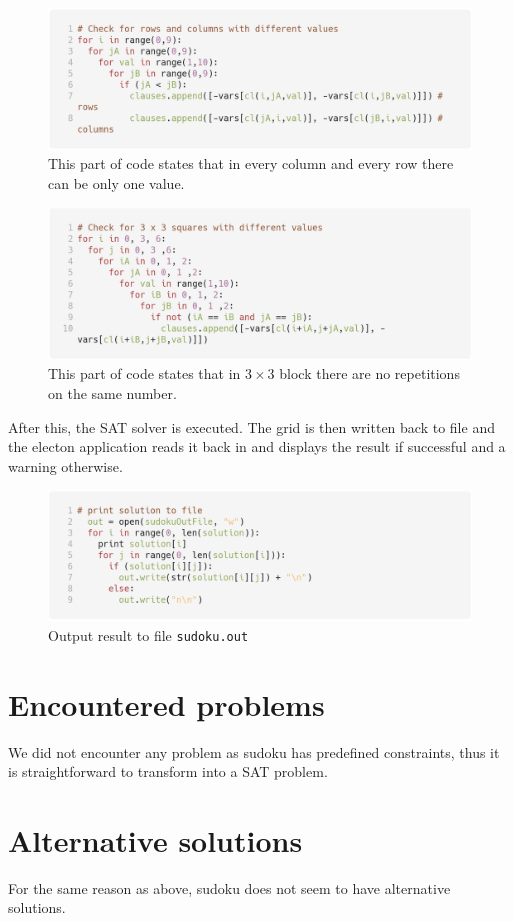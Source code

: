 \documentclass[10pt]{article}
\begin{document}
\begin{figure}[h!]
  \centering
  \includegraphics[width=\textwidth]{clause_03.png}
  \caption{This part of code states that in every column and every row there
  can be only one value.}
\end{figure}

\begin{figure}[h!]
  \centering
  \includegraphics[width=\textwidth]{clause_04.png}
  \caption{This part of code states that in \(3 \times 3 \) block there are no
  repetitions on the same number.}
\end{figure}

After this, the SAT solver is executed.
The grid is then written back to file and the electon application reads it back in and displays the result if successful
and a warning otherwise.

\begin{figure}[h!]
  \centering
  \includegraphics[width=\textwidth]{printBack.png}
  \caption{Output result to file \texttt{sudoku.out}}
\end{figure}

\section*{Encountered problems}
We did not encounter any problem as sudoku has predefined constraints,
thus it is straightforward to transform into a SAT problem.

\section*{Alternative solutions}
For the same reason as above, sudoku does not seem to have alternative solutions.
\end{document}

